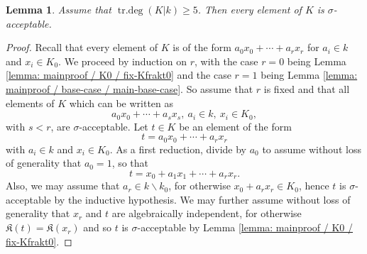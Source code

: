 \documentclass[11pt]{amsart}
\newtheorem{lemma}[proposition]{Lemma}
\theoremstyle{definition}
\theoremstyle{remark}
\numberwithin{equation}{section}
\DeclareMathOperator{\trdeg}{tr.deg}
\newcommand{\Kfrak}{\mathfrak{K}}
\begin{document}
\begin{lemma}
\label{lemma: mainproof / general-case / all-acceptable}
  Assume that $\trdeg(K|k) \geq 5$.
  Then every element of $K$ is $\sigma$-acceptable.
\end{lemma}
\begin{proof}
  Recall that every element of $K$ is of the form $a_0 x_0 + \cdots + a_r x_r$ for $a_i \in k$ and $x_i \in K_0$.
  We proceed by induction on $r$, with the case $r = 0$ being Lemma \ref{lemma: mainproof / K0 / fix-Kfrakt0} and the case $r = 1$ being Lemma \ref{lemma: mainproof / base-case / main-base-case}.
  So assume that $r$ is fixed and that all elements of $K$ which can be written as
  \[ a_0 x_0 + \cdots + a_s x_s, \ a_i \in k, \ x_i \in K_0, \]
  with $s < r$, are $\sigma$-acceptable.
  Let $t \in K$ be an element of the form
  \[ t = a_0 x_0 + \cdots + a_r x_r \]
  with $a_i \in k$ and $x_i \in K_0$.
  As a first reduction, divide by $a_0$ to assume without loss of generality that $a_0 = 1$, so that
  \[ t = x_0 + a_1 x_1 + \cdots + a_r x_r. \]
  Also, we may assume that $a_r \in k \smallsetminus k_0$, for otherwise $x_0 + a_r x_r \in K_0$, hence $t$ is $\sigma$-acceptable by the inductive hypothesis.
  We may further assume without loss of generality that $x_r$ and $t$ are algebraically independent, for otherwise $\Kfrak(t) = \Kfrak(x_r)$ and so $t$ is $\sigma$-acceptable by Lemma \ref{lemma: mainproof / K0 / fix-Kfrakt0}.


\end{proof}
\end{document}
